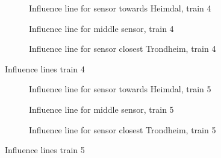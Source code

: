 \begin{figure}[h]
  \begin{subfigure}[t]{0.9\textwidth}
    \centering
    
    \caption{Influence line for sensor towards Heimdal, train 4}
    \label{infl_Heimdal_train4}
  \end{subfigure}
  \begin{subfigure}[t]{0.9\textwidth}
    \centering
    
    \caption{Influence line for middle sensor, train 4}
    \label{infl_middle_train4}
  \end{subfigure}
  \begin{subfigure}[t]{0.9\textwidth}
    \centering
    
    \caption{Influence line for sensor closest Trondheim, train 4}
    \label{infl_Trondheim_train4}
  \end{subfigure}
  \caption{Influence lines train 4}
  \label{influence_lines_train3}
\end{figure}

\begin{figure}[h]
  \begin{subfigure}[t]{0.9\textwidth}
    \centering
    
    \caption{Influence line for sensor towards Heimdal, train 5}
    \label{infl_Heimdal_train5}
  \end{subfigure}
  \begin{subfigure}[t]{0.9\textwidth}
    \centering
    
    \caption{Influence line for middle sensor, train 5}
    \label{infl_middle_train5}
  \end{subfigure}
  \begin{subfigure}[t]{0.9\textwidth}
    \centering
    
    \caption{Influence line for sensor closest Trondheim, train 5}
    \label{infl_Trondheim_train5}
  \end{subfigure}
  \caption{Influence lines train 5}
  \label{influence_lines_train5}
\end{figure}

